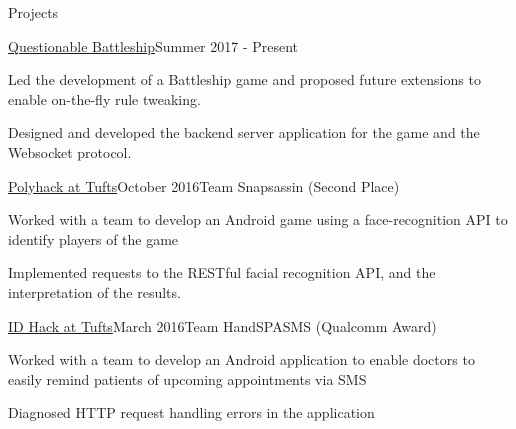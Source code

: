 \documentclass{resume} %
\begin{document}
\begin{rSection}{Projects}




\begin{rSubsection}{\href {https://www.questionablebattleship.com/}{Questionable
    Battleship}}{Summer 2017 - Present}{}

\item Led the development of a Battleship game and proposed future extensions to
    enable on-the-fly rule tweaking.

\item Designed and developed the backend server application for the game and the
    Websocket protocol.

\end{rSubsection}

\begin{rSubsection}{\href{http://2016.polyhack.tufts.io/}{Polyhack at
    Tufts}}{October 2016}{Team Snapsassin (Second Place)}

\item Worked with a team to develop an Android game using a face-recognition
    API to identify players of the game

\item Implemented requests to the RESTful facial recognition API, and the
    interpretation of the results.

\end{rSubsection}

\begin{rSubsection}{\href{https://idhack16.devpost.com/}{ID Hack at
    Tufts}}{March 2016}{Team HandSPASMS (Qualcomm Award)}

\item Worked with a team to develop an Android application to enable doctors
    to easily remind patients of upcoming appointments via SMS

\item Diagnosed HTTP request handling errors in the application

\end{rSubsection}
\end{rSection}
\end{document}
